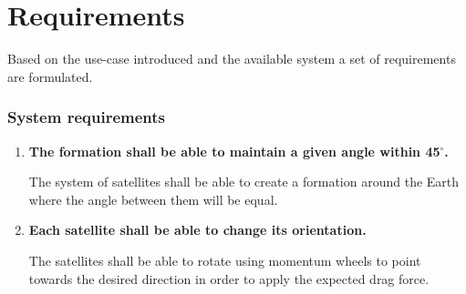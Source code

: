\chapter{Requirements}\label{chap:requirements}
Based on the use-case introduced and the available system a set of requirements are formulated.
%
\subsection*{System requirements}
%
\begin{enumerate}
	\item \textbf{The formation shall be able to maintain a given angle within 45$^{\circ}$.}
	
	The system of satellites shall be able to create a formation around the Earth where the angle between them will be equal.   
	
		\item \textbf{Each satellite shall be able to change its orientation.}
		
	The satellites shall be able to rotate using momentum wheels to point towards the desired direction in order to apply the expected drag force. 	
\end{enumerate}

